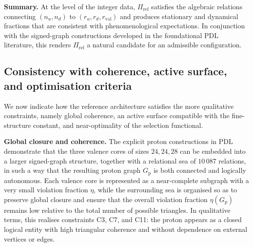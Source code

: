 \documentclass[11pt,a4paper]{article}
\begin{document}
\medskip
\noindent\textbf{Summary.} At the level of the integer data, $\Pi_{\mathrm{ref}}$ satisfies the algebraic relations connecting $(n_u,n_d)$ to $(r_u,r_d,r_{\mathrm{val}})$ and produces stationary and dynamical fractions that are consistent with phenomenological expectations. In conjunction with the signed-graph constructions developed in the foundational PDL literature, this renders $\Pi_{\mathrm{ref}}$ a natural candidate for an admissible configuration.\cite{LaubscherPDLFull2026,LaubscherLDP2026}

\subsection{Consistency with coherence, active surface, and optimisation criteria}

We now indicate how the reference architecture satisfies the more qualitative constraints, namely global coherence, an active surface compatible with the fine-structure constant, and near-optimality of the selection functional.

\medskip
\noindent\textbf{Global closure and coherence.} The explicit proton constructions in PDL demonstrate that the three valence cores of sizes $24,24,28$ can be embedded into a larger signed-graph structure, together with a relational sea of $10\,087$ relations, in such a way that the resulting proton graph $G_{\mathrm{p}}$ is both connected and logically autonomous.\cite{LaubscherPDLFull2026,LaubscherLDP2026} Each valence core is represented as a near-complete subgraph with a very small violation fraction $\eta$, while the surrounding sea is organised so as to preserve global closure and ensure that the overall violation fraction $\eta(G_{\mathrm{p}})$ remains low relative to the total number of possible triangles.\cite{LaubscherPDLFull2026} In qualitative terms, this realises constraints C3, C7, and C11: the proton appears as a closed logical entity with high triangular coherence and without dependence on external vertices or edges.
\end{document}
